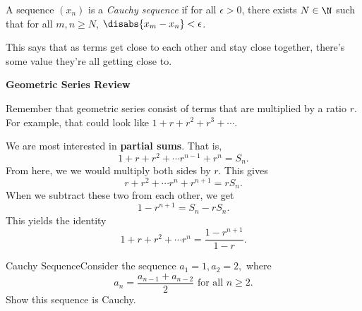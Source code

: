 \begin{definition}
    A sequence \((x_n)\) is a \textit{Cauchy sequence} if for all \(\epsilon > 0\), there exists \(N \in \N\) such that for all \(m,n \geq N\), \(\disabs{x_m - x_n} < \epsilon\).
\end{definition}

This says that as terms get close to each other and stay close together, there's some value they're all getting close to.

\begin{center}
    \textbf{Geometric Series Review}
\end{center}

Remember that geometric series consist of terms that are multiplied by a ratio \(r\). For example, that could look like \(1 + r + r^{2} + r^{3} + \cdots\).

We are most interested in \textbf{partial sums}. That is,
\[
    1 + r + r^{2} + \cdots r^{n - 1} + r^{n} = S_{n}.
\]
From here, we we would multiply both sides by \(r\). This gives
\[
    r + r^{2} + \cdots r^{n} + r^{n + 1} = rS_{n}.
\]
When we subtract these two from each other, we get
\[
    1 - r^{n + 1} = S_{n} - rS_{n}.
\]
This yields the identity
\[
    1 + r + r^{2} + \cdots r^{n} = \frac{1-r^{n + 1}}{1 - r}.
\]

\begin{example}
    {Cauchy Sequence}Consider the sequence \(a_1 = 1, a_2 = 2,\) where \[a_n = \frac{a_{n-1} + a_{n-2}}{2} \text{ for all } n \geq 2.\] Show this sequence is Cauchy.
\end{example}

